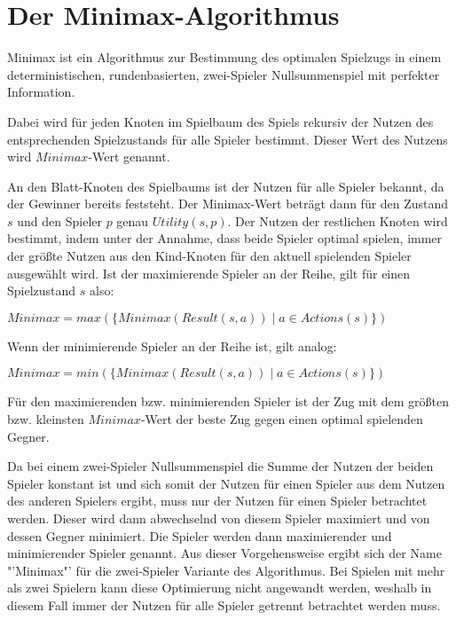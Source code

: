 \section{Der Minimax-Algorithmus}

Minimax ist ein Algorithmus zur Bestimmung des optimalen Spielzugs in einem deterministischen, rundenbasierten,
zwei-Spieler Nullsummenspiel mit perfekter Information.

Dabei wird für jeden Knoten im Spielbaum des Spiels rekursiv der Nutzen des entsprechenden Spielzustands für alle
Spieler bestimmt. Dieser Wert des Nutzens wird $Minimax$-Wert genannt.

An den Blatt-Knoten des Spielbaums ist der Nutzen für alle Spieler bekannt, da der Gewinner bereits feststeht. Der
Minimax-Wert beträgt dann für den Zustand $s$ und den Spieler $p$ genau $Utility(s, p)$. Der Nutzen der restlichen Knoten
wird bestimmt, indem unter der Annahme, dass beide Spieler optimal spielen, immer der größte Nutzen aus den Kind-Knoten
für den aktuell spielenden Spieler ausgewählt wird. Ist der maximierende Spieler an der Reihe, gilt für einen
Spielzustand $s$ also:

\hspace*{1.3cm}
$Minimax=max(\{Minimax(Result(s, a)) \mid a \in Actions(s)\})$

Wenn der minimierende Spieler an der Reihe ist, gilt analog:

\hspace*{1.3cm}
$Minimax=min(\{Minimax(Result(s, a)) \mid a \in Actions(s)\})$

Für den maximierenden bzw. minimierenden Spieler ist der Zug mit dem größten bzw. kleinsten $Minimax$-Wert der beste Zug
gegen einen optimal spielenden Gegner.
\cite[S.~164f.]{ai2010russel}

Da bei einem zwei-Spieler Nullsummenspiel die Summe der Nutzen der beiden Spieler konstant ist und sich somit der
Nutzen für einen Spieler aus dem Nutzen des anderen Spielers ergibt, muss nur der Nutzen für einen Spieler betrachtet
werden. Dieser wird dann abwechselnd von diesem Spieler maximiert und von dessen Gegner minimiert. Die Spieler werden
dann maximierender und minimierender Spieler genannt. Aus dieser Vorgehensweise ergibt sich der Name "'Minimax"'
für die zwei-Spieler Variante des Algorithmus. Bei Spielen mit mehr als zwei Spielern kann diese Optimierung nicht
angewandt werden, weshalb in diesem Fall immer der Nutzen für alle Spieler getrennt betrachtet werden muss.
\cite[S.~165]{ai2010russel}




